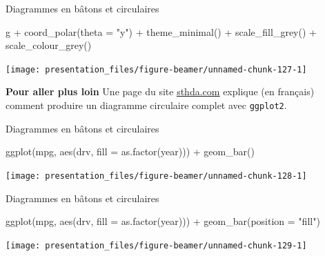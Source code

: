 \documentclass[12pt,handout,ignorenonframetext,]{beamer}
\newenvironment{Shaded}{}{}
\newcommand{\KeywordTok}[1]{\textcolor[rgb]{0.00,0.00,1.00}{#1}}
\newcommand{\DataTypeTok}[1]{#1}
\newcommand{\StringTok}[1]{\textcolor[rgb]{0.00,0.50,0.50}{#1}}
\newcommand{\OperatorTok}[1]{#1}
\newcommand{\NormalTok}[1]{#1}
\renewenvironment{Shaded}{\begin{snugshade}}{\end{snugshade}}
\begin{document}
\begin{frame}[fragile]{Diagrammes en bâtons et circulaires}

\footnotesize \center

\begin{Shaded}
\begin{Highlighting}[]
\NormalTok{g }\OperatorTok{+}\StringTok{ }\KeywordTok{coord_polar}\NormalTok{(}\DataTypeTok{theta =} \StringTok{"y"}\NormalTok{) }\OperatorTok{+}\StringTok{ }\KeywordTok{theme_minimal}\NormalTok{() }\OperatorTok{+}
\StringTok{  }\KeywordTok{scale_fill_grey}\NormalTok{() }\OperatorTok{+}\StringTok{ }\KeywordTok{scale_colour_grey}\NormalTok{()}
\end{Highlighting}
\end{Shaded}

\texttt{[image: presentation\_files/figure-beamer/unnamed-chunk-127-1]}

\pause \raggedright \small

\textbf{Pour aller plus loin} Une page du site
\href{http://www.sthda.com/french/wiki/ggplot2-graphique-en-camembert-guide-de-demarrage-rapide-logiciel-r-et-visualisation-de-donnees}{\underline{sthda.com}}
explique (en français) comment produire un diagramme circulaire complet
avec \texttt{ggplot2}.

\end{frame}

\begin{frame}[fragile]{Diagrammes en bâtons et circulaires}

\footnotesize \center

\begin{Shaded}
\begin{Highlighting}[]
\KeywordTok{ggplot}\NormalTok{(mpg, }\KeywordTok{aes}\NormalTok{(drv, }\DataTypeTok{fill =} \KeywordTok{as.factor}\NormalTok{(year))) }\OperatorTok{+}\StringTok{ }
\StringTok{  }\KeywordTok{geom_bar}\NormalTok{()}
\end{Highlighting}
\end{Shaded}

\texttt{[image: presentation\_files/figure-beamer/unnamed-chunk-128-1]}

\end{frame}

\begin{frame}[fragile]{Diagrammes en bâtons et circulaires}

\footnotesize \center

\begin{Shaded}
\begin{Highlighting}[]
\KeywordTok{ggplot}\NormalTok{(mpg, }\KeywordTok{aes}\NormalTok{(drv, }\DataTypeTok{fill =} \KeywordTok{as.factor}\NormalTok{(year))) }\OperatorTok{+}\StringTok{ }
\StringTok{  }\KeywordTok{geom_bar}\NormalTok{(}\DataTypeTok{position =} \StringTok{"fill"}\NormalTok{)}
\end{Highlighting}
\end{Shaded}

\texttt{[image: presentation\_files/figure-beamer/unnamed-chunk-129-1]}

\end{frame}
\end{document}
